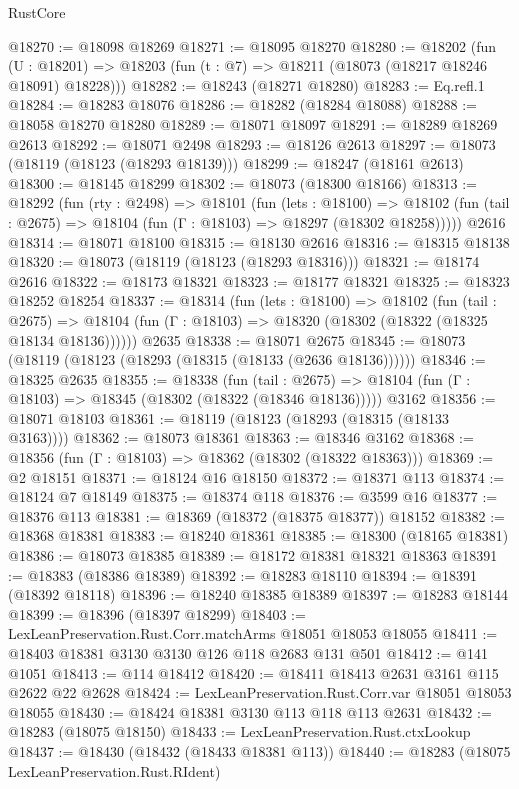 \begin{lexlean}{RustCore}
\begin{coremodule}
@18270 := @18098 @18269
@18271 := @18095 @18270
@18280 := @18202
    (fun (U : @18201) => @18203 (fun (t : @7) => @18211 (@18073 (@18217 @18246 @18091) @18228)))
@18282 := @18243 (@18271 @18280)
@18283 := Eq.refl.{1}
@18284 := @18283 @18076
@18286 := @18282 (@18284 @18088)
@18288 := @18058 @18270 @18280
@18289 := @18071 @18097
@18291 := @18289 @18269 @2613
@18292 := @18071 @2498
@18293 := @18126 @2613
@18297 := @18073 (@18119 (@18123 (@18293 @18139)))
@18299 := @18247 (@18161 @2613)
@18300 := @18145 @18299
@18302 := @18073 (@18300 @18166)
@18313 := @18292
    (fun (rty : @2498) =>
    @18101
      (fun (lets : @18100) =>
      @18102 (fun (tail : @2675) => @18104 (fun (Γ : @18103) => @18297 (@18302 @18258)))))
    @2616
@18314 := @18071 @18100
@18315 := @18130 @2616
@18316 := @18315 @18138
@18320 := @18073 (@18119 (@18123 (@18293 @18316)))
@18321 := @18174 @2616
@18322 := @18173 @18321
@18323 := @18177 @18321
@18325 := @18323 @18252 @18254
@18337 := @18314
    (fun (lets : @18100) =>
    @18102
      (fun (tail : @2675) =>
      @18104 (fun (Γ : @18103) => @18320 (@18302 (@18322 (@18325 @18134 @18136))))))
    @2635
@18338 := @18071 @2675
@18345 := @18073 (@18119 (@18123 (@18293 (@18315 (@18133 (@2636 @18136))))))
@18346 := @18325 @2635
@18355 := @18338
    (fun (tail : @2675) => @18104 (fun (Γ : @18103) => @18345 (@18302 (@18322 (@18346 @18136)))))
    @3162
@18356 := @18071 @18103
@18361 := @18119 (@18123 (@18293 (@18315 (@18133 @3163))))
@18362 := @18073 @18361
@18363 := @18346 @3162
@18368 := @18356 (fun (Γ : @18103) => @18362 (@18302 (@18322 @18363)))
@18369 := @2 @18151
@18371 := @18124 @16 @18150
@18372 := @18371 @113
@18374 := @18124 @7 @18149
@18375 := @18374 @118
@18376 := @3599 @16
@18377 := @18376 @113
@18381 := @18369 (@18372 (@18375 @18377)) @18152
@18382 := @18368 @18381
@18383 := @18240 @18361
@18385 := @18300 (@18165 @18381)
@18386 := @18073 @18385
@18389 := @18172 @18381 @18321 @18363
@18391 := @18383 (@18386 @18389)
@18392 := @18283 @18110
@18394 := @18391 (@18392 @18118)
@18396 := @18240 @18385 @18389
@18397 := @18283 @18144
@18399 := @18396 (@18397 @18299)
@18403 := LexLeanPreservation.Rust.Corr.matchArms @18051 @18053 @18055
@18411 := @18403 @18381 @3130 @3130 @126 @118 @2683 @131 @501
@18412 := @141 @1051
@18413 := @114 @18412
@18420 := @18411 @18413 @2631 @3161 @115 @2622 @22 @2628
@18424 := LexLeanPreservation.Rust.Corr.var @18051 @18053 @18055
@18430 := @18424 @18381 @3130 @113 @118 @113 @2631
@18432 := @18283 (@18075 @18150)
@18433 := LexLeanPreservation.Rust.ctxLookup
@18437 := @18430 (@18432 (@18433 @18381 @113))
@18440 := @18283 (@18075 LexLeanPreservation.Rust.RIdent)

\end{coremodule}
\end{lexlean}

